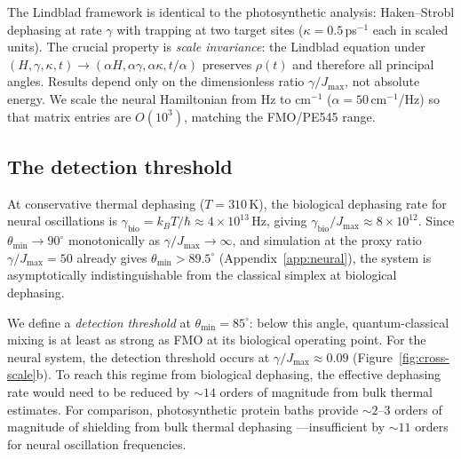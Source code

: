 \documentclass[12pt,a4paper]{article}
\theoremstyle{definition}
\theoremstyle{remark}
\begin{document}
The Lindblad framework is identical to the photosynthetic analysis: Haken--Strobl dephasing at rate $\gamma$ with trapping at two target sites ($\kappa = 0.5$\,ps$^{-1}$ each in scaled units). The crucial property is \emph{scale invariance}: the Lindblad equation under $(H, \gamma, \kappa, t) \to (\alpha H, \alpha\gamma, \alpha\kappa, t/\alpha)$ preserves $\rho(t)$ and therefore all principal angles. Results depend only on the dimensionless ratio $\gamma/J_{\max}$, not absolute energy. We scale the neural Hamiltonian from Hz to cm$^{-1}$ ($\alpha = 50$\,cm$^{-1}$/Hz) so that matrix entries are $O(10^3)$, matching the FMO/PE545 range.

\subsection{The detection threshold}
\label{sec:detection-threshold}

At conservative thermal dephasing ($T = 310$\,K), the biological dephasing rate for neural oscillations is $\gamma_{\mathrm{bio}} = k_BT/\hbar \approx 4 \times 10^{13}$\,Hz, giving $\gamma_{\mathrm{bio}}/J_{\max} \approx 8 \times 10^{12}$. Since $\theta_{\min} \to 90^\circ$ monotonically as $\gamma/J_{\max} \to \infty$, and simulation at the proxy ratio $\gamma/J_{\max} = 50$ already gives $\theta_{\min} > 89.5^\circ$ (Appendix~\ref{app:neural}), the system is asymptotically indistinguishable from the classical simplex at biological dephasing.

We define a \emph{detection threshold} at $\theta_{\min} = 85^\circ$: below this angle, quantum-classical mixing is at least as strong as FMO at its biological operating point. For the neural system, the detection threshold occurs at $\gamma/J_{\max} \approx 0.09$ (Figure~\ref{fig:cross-scale}b). To reach this regime from biological dephasing, the effective dephasing rate would need to be reduced by ${\sim}14$ orders of magnitude from bulk thermal estimates. For comparison, photosynthetic protein baths provide ${\sim}2$--$3$ orders of magnitude of shielding from bulk thermal dephasing \cite{cao2020quantum}---insufficient by ${\sim}11$ orders for neural oscillation frequencies.
\end{document}
